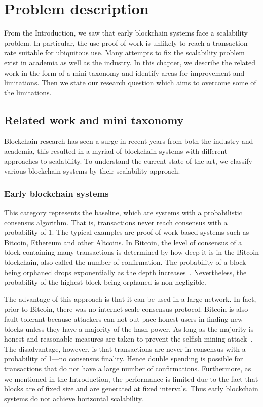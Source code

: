 \chapter{Problem description}
\label{ch:problem}

From the Introduction, we saw that early blockchain systems face a scalability problem.
In particular, the use proof-of-work is unlikely to reach a transaction rate suitable for ubiquitous use.
Many attempts to fix the scalability problem exist in academia as well as the industry.
In this chapter, we describe the related work in the form of a mini taxonomy and identify areas for improvement and limitations.
Then we state our research question which aims to overcome some of the limitations.

\section{Related work and mini taxonomy}
\label{sec:taxonomy}

Blockchain research has seen a surge in recent years from both the industry and academia,
this resulted in a myriad of blockchain systems with different approaches to scalability.
To understand the current state-of-the-art,
we classify various blockchain systems by their scalability approach.

\subsection{Early blockchain systems}
This category represents the baseline,
which are systems with a probabilistic consensus algorithm.
That is, transactions never reach consensus with a probability of 1.
The typical examples are proof-of-work based systems such as Bitcoin, Ethereum and other Altcoins.
In Bitcoin, the level of consensus of a block containing many transactions is determined by how deep it is in the Bitcoin blockchain,
also called the number of confirmation.
The probability of a block being orphaned drops exponentially as the depth increases~\cite{bitcoin}.
Nevertheless, the probability of the highest block being orphaned is non-negligible.

The advantage of this approach is that it can be used in a large network.
In fact, prior to Bitcoin, there was no internet-scale consensus protocol.
Bitcoin is also fault-tolerant because attackers can not out pace honest users in finding new blocks unless they have a majority of the hash power.
As long as the majority is honest and reasonable measures are taken to prevent the selfish mining attack~\cite{eyal2014majority}.
The disadvantage, however, is that transactions are never in consensus with a probability of 1---no consensus finality.
Hence double spending is possible for transactions that do not have a large number of confirmations.
Furthermore, as we mentioned in the Introduction,
the performance is limited due to the fact that blocks are of fixed size and are generated at fixed intervals.
Thus early blockchain systems do not achieve horizontal scalability.

